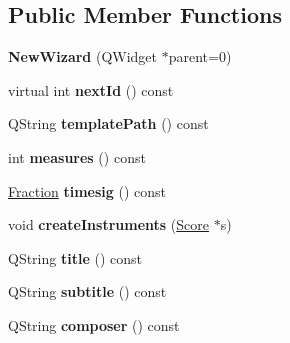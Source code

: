 \subsection*{Public Member Functions}
\begin{DoxyCompactItemize}
\item 
\mbox{\label{class_ms_1_1_new_wizard_acc73afe75a2bc0c0d4ffeaaa684319de}} 
{\bfseries New\+Wizard} (Q\+Widget $\ast$parent=0)
\item 
\mbox{\label{class_ms_1_1_new_wizard_a6d88915a1e42cd2ebaeb8b053f369d63}} 
virtual int {\bfseries next\+Id} () const
\item 
\mbox{\label{class_ms_1_1_new_wizard_aa75cafbb1f2a2c1d03ef374c7d2ea488}} 
Q\+String {\bfseries template\+Path} () const
\item 
\mbox{\label{class_ms_1_1_new_wizard_a26edf92f7d66df9df3ef44b513de2c2f}} 
int {\bfseries measures} () const
\item 
\mbox{\label{class_ms_1_1_new_wizard_ab1e19ff8b7bd1355c4948b67a1761ccc}} 
\hyperlink{class_ms_1_1_fraction}{Fraction} {\bfseries timesig} () const
\item 
\mbox{\label{class_ms_1_1_new_wizard_a920134196466d3c7d5b8a34754ae6217}} 
void {\bfseries create\+Instruments} (\hyperlink{class_ms_1_1_score}{Score} $\ast$s)
\item 
\mbox{\label{class_ms_1_1_new_wizard_a37d5fb4485c985ab5e4d7632091a275c}} 
Q\+String {\bfseries title} () const
\item 
\mbox{\label{class_ms_1_1_new_wizard_aa9ea919ec77c1f7afba5030a11f60aa1}} 
Q\+String {\bfseries subtitle} () const
\item 
\mbox{\label{class_ms_1_1_new_wizard_a30b720fe5858aefbd6fe189137c80d0a}} 
Q\+String {\bfseries composer} () const
\item 
\mbox{\label{class_ms_1_1_new_wizard_a57c06634d42dc7bf23563728416c48af}} 

\end{DoxyCompactItemize}
